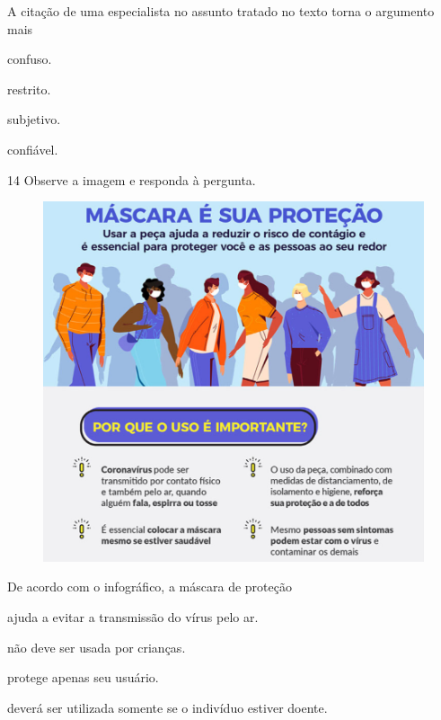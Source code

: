 A citação de uma especialista no assunto tratado no texto torna o
argumento mais

\begin{multicols}{2}
\begin{escolha}
  \item confuso.

  \item restrito.

  \item subjetivo.

  \item confiável.
\end{escolha}
\end{multicols}

\num{14} Observe a imagem e responda à pergunta.

\begin{figure}
\centering
\includegraphics[width=.9\textwidth]{./imgQ4PORT/media/image2.png}
\end{figure}


De acordo com o infográfico, a máscara de proteção

\begin{escolha}
  \item ajuda a evitar a transmissão do vírus pelo ar.

  \item não deve ser usada por crianças.

  \item protege apenas seu usuário.

  \item deverá ser utilizada somente se o indivíduo estiver doente.
\end{escolha}



